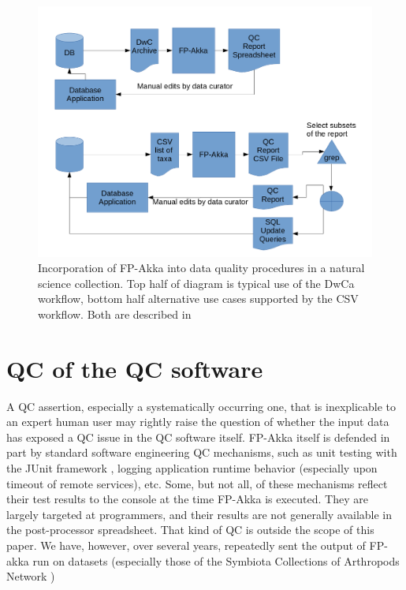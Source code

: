 \documentclass{article}
\begin{document}
\begin{figure}[h]
\includegraphics[width=\textwidth]{FP-Akka-externaldataflowpaths.png}
\caption{Incorporation of FP-Akka into data quality procedures in a natural science collection.  Top half of diagram is typical use of the DwCa workflow, bottom half alternative use cases supported by the CSV workflow. Both are described in \citep{Kurator_wiki_2016}}
\label{fig:largerprocesses}
\end{figure}


\section{QC of the QC software}
A QC assertion, especially a systematically occurring one, that is inexplicable to an expert human user may rightly raise the question of whether the input data has exposed a QC issue in the QC software itself. FP-Akka itself is defended in part by standard software engineering QC mechanisms, such as unit testing
\citep{Fraser:2003:DPT:949344.949407} with the JUnit framework \citep{junit-web-2010}, logging application runtime behavior (especially upon timeout of remote services), etc. Some, but not all, of these mechanisms reflect their test results to the console at the time FP-Akka is executed. They are largely targeted at programmers, and their results are not generally available in the post-processor spreadsheet. That kind of QC is outside the scope of this paper.  We have, however, over several years, repeatedly sent the output of FP-akka run on datasets (especially those of the Symbiota Collections of Arthropods Network \citep{SCAN_TCN_website_2016})
\end{document}

